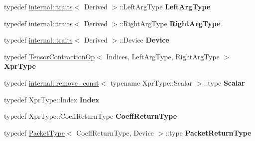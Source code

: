 \begin{DoxyCompactItemize}
typedef \hyperlink{struct_eigen_1_1internal_1_1traits}{internal\+::traits}$<$ Derived $>$\+::Left\+Arg\+Type {\bfseries Left\+Arg\+Type}
\item 
\mbox{\label{struct_eigen_1_1_tensor_contraction_evaluator_base_a8661d0cd4198c090a6f50da7d7457f6c}} 
typedef \hyperlink{struct_eigen_1_1internal_1_1traits}{internal\+::traits}$<$ Derived $>$\+::Right\+Arg\+Type {\bfseries Right\+Arg\+Type}
\item 
\mbox{\label{struct_eigen_1_1_tensor_contraction_evaluator_base_a4a9a927d07b41e09823316da0575cb42}} 
typedef \hyperlink{struct_eigen_1_1internal_1_1traits}{internal\+::traits}$<$ Derived $>$\+::Device {\bfseries Device}
\item 
\mbox{\label{struct_eigen_1_1_tensor_contraction_evaluator_base_aa5dd727964de1120361b1fc1cfd33ede}} 
typedef \hyperlink{class_eigen_1_1_tensor_contraction_op}{Tensor\+Contraction\+Op}$<$ Indices, Left\+Arg\+Type, Right\+Arg\+Type $>$ {\bfseries Xpr\+Type}
\item 
\mbox{\label{struct_eigen_1_1_tensor_contraction_evaluator_base_a8284b1fb35e07c6e30f875b12653b44b}} 
typedef \hyperlink{struct_eigen_1_1internal_1_1remove__const}{internal\+::remove\+\_\+const}$<$ typename Xpr\+Type\+::\+Scalar $>$\+::type {\bfseries Scalar}
\item 
\mbox{\label{struct_eigen_1_1_tensor_contraction_evaluator_base_a79df006e2a7b5edd3e71382016865362}} 
typedef Xpr\+Type\+::\+Index {\bfseries Index}
\item 
\mbox{\label{struct_eigen_1_1_tensor_contraction_evaluator_base_a03e212da1d23eb224d3b92b81ad16c22}} 
typedef Xpr\+Type\+::\+Coeff\+Return\+Type {\bfseries Coeff\+Return\+Type}
\item 
\mbox{\label{struct_eigen_1_1_tensor_contraction_evaluator_base_aebff34eb713205655a84ce43bf1a01af}} 
typedef \hyperlink{struct_eigen_1_1_packet_type}{Packet\+Type}$<$ Coeff\+Return\+Type, Device $>$\+::type {\bfseries Packet\+Return\+Type}

\end{DoxyCompactItemize}
